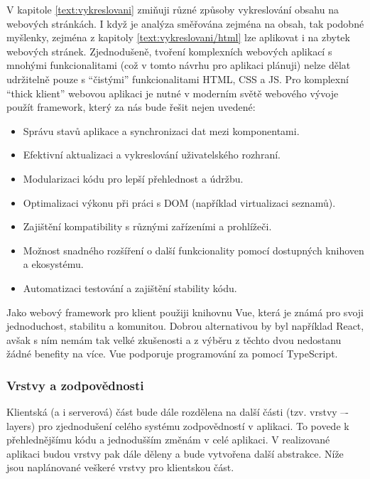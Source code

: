 V kapitole \ref{text:vykreslovani} zmiňuji různé způsoby vykreslování obsahu na webových stránkách.
I když je analýza směřována zejména na obsah, tak podobné myšlenky, zejména z kapitoly \ref{text:vykreslovani/html} lze aplikovat i na zbytek webových stránek.
Zjednodušeně, tvoření komplexních webových aplikací s mnohými funkcionalitami (což v tomto návrhu pro aplikaci plánuji) nelze dělat udržitelně pouze s \enquote{čistými} funkcionalitami HTML, CSS a JS.
Pro komplexní \enquote{thick klient} webovou aplikaci je nutné v moderním světě webového vývoje použít framework, který za nás bude řešit nejen uvedené:

\begin{itemize}
    \item Správu stavů aplikace a synchronizaci dat mezi komponentami.
    \item Efektivní aktualizaci a vykreslování uživatelského rozhraní.
    \item Modularizaci kódu pro lepší přehlednost a údržbu.
    \item Optimalizaci výkonu při práci s DOM (například virtualizaci seznamů).
    \item Zajištění kompatibility s různými zařízeními a prohlížeči.
    \item Možnost snadného rozšíření o další funkcionality pomocí dostupných knihoven a ekosystému.
    \item Automatizaci testování a zajištění stability kódu.
\end{itemize}

Jako webový framework pro klient použiji knihovnu Vue, která je známá pro svoji jednoduchost, stabilitu a komunitou.
Dobrou alternativou by byl například React, avšak s ním nemám tak velké zkušenosti a z výběru z těchto dvou nedostanu žádné benefity na více.
Vue podporuje programování za pomocí TypeScript.

\subsubsection{Vrstvy a zodpovědnosti}

Klientská (a i serverová) část bude dále rozdělena na další části (tzv. vrstvy –- layers) pro zjednodušení celého systému zodpovědností v aplikaci.
To povede k přehlednějšímu kódu a jednodušším změnám v celé aplikaci.
V realizované aplikaci budou vrstvy pak dále děleny a bude vytvořena další abstrakce.
Níže jsou naplánované veškeré vrstvy pro klientskou část.

